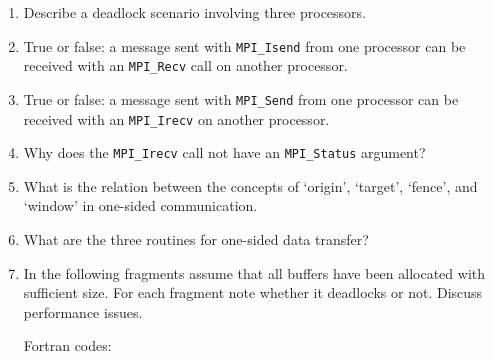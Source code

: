 \begin{enumerate}
\item Describe a deadlock scenario involving three processors.

\item True or false: a message sent with \lstinline{MPI_Isend} from one processor can be
  received with an \lstinline{MPI_Recv} call on another processor.

\item True or false: a message sent with \lstinline{MPI_Send} from one processor can be
  received with an \lstinline{MPI_Irecv} on another processor.

\item Why does the \lstinline{MPI_Irecv} call not have an \lstinline{MPI_Status} argument?

\item What is the relation between the concepts of `origin', `target', `fence',
  and `window' in one-sided communication.

\item What are the three routines for one-sided data transfer?

\lstset{
  style=reviewcode,
  language=C,
}

\item In the following fragments %
  assume that all buffers have been
  allocated with sufficient size. For each fragment note whether it
  deadlocks or not. Discuss performance issues.

    \lstset{language=C,basicstyle=\footnotesize\ttfamily}
    
    
    
    
    

    \pagebreak
    Fortran codes:
    
    \lstset{style=reviewcode,language=Fortran}

  \lstset{language=Fortran,basicstyle=\footnotesize\ttfamily}
  
  
  
  
  


\end{enumerate}

